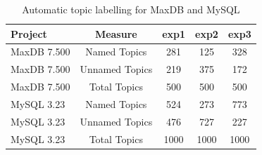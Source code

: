 \documentclass[]{sig-alternate}
\begin{document}
\begin{table}[h]

	\centering
\begin{tabular}{l|c|c|c|c}
\toprule
Project & Measure & \textsf{exp1} & \textsf{exp2} & \textsf{exp3} \\
\midrule



MaxDB 7.500 & Named Topics   & 281 & 125 & 328 \\ %
MaxDB 7.500 & Unnamed Topics & 219  & 375 &  172  \\
MaxDB 7.500 & Total  Topics  & 500 & 500 & 500 \\
\midrule
MySQL 3.23  & Named Topics   & 524 & 273 & 773 \\
MySQL 3.23  & Unnamed Topics & 476 & 727 & 227 \\
MySQL 3.23  & Total  Topics  & 1000 & 1000 & 1000 \\


\bottomrule
\end{tabular}
	\caption{Automatic topic labelling for MaxDB and MySQL}%
	\label{tbl:wordlist}

\end{table}
\end{document}
